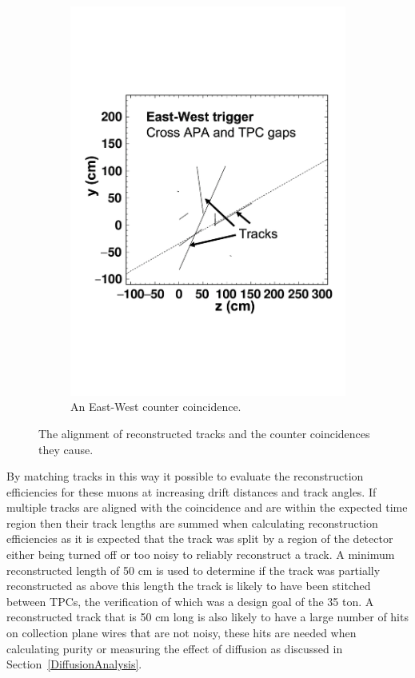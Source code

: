 \begin{figure}[h!]
\begin{subfigure}{0.45\textwidth}
    \includegraphics[width=\textwidth]{East-West}
    \caption{An East-West counter coincidence.}
  \end{subfigure}
  \caption[The alignment of tracks and counter coincidences]
          {The alignment of reconstructed tracks and the counter coincidences they cause.}
          \label{fig:CounterTrackAngle}
\end{figure}

By matching tracks in this way it possible to evaluate the reconstruction efficiencies for these muons at increasing drift distances and track angles. If multiple tracks are aligned with the coincidence and are within the expected time region then their track lengths are summed when calculating reconstruction efficiencies as it is expected that the track was split by a region of the detector either being turned off or too noisy to reliably reconstruct a track. A minimum reconstructed length of 50 cm is used to determine if the track was partially reconstructed as above this length the track is likely to have been stitched between TPCs, the verification of which was a design goal of the 35 ton. A reconstructed track that is 50 cm long is also likely to have a large number of hits on collection plane wires that are not noisy, these hits are needed when calculating purity or measuring the effect of diffusion as discussed in Section~\ref{DiffusionAnalysis}. \\

